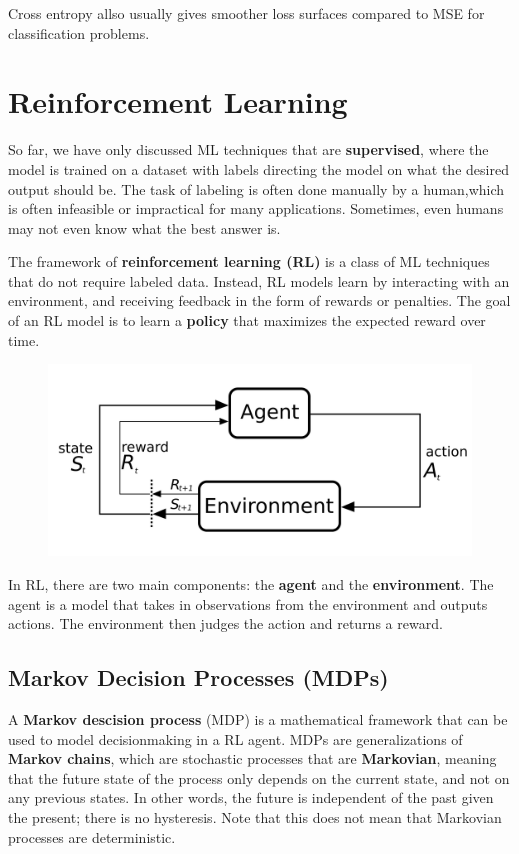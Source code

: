 \documentclass[12pt]{report}
\theoremstyle{definition}
\theoremstyle{remark}
\begin{document}
Cross entropy allso usually gives smoother loss surfaces compared to MSE for classification problems.

\chapter{Reinforcement Learning}
So far, we have only discussed ML techniques that are \textbf{supervised}, where the model is trained on a dataset with labels directing the model on what the desired output should be. The task of labeling is often done manually by a human,which is often infeasible or impractical for many applications. Sometimes, even humans may not even know what the best answer is.

The framework of \textbf{reinforcement learning (RL)} is a class of ML techniques that do not require labeled data. Instead, RL models learn by interacting with an environment, and receiving feedback in the form of rewards or penalties. The goal of an RL model is to learn a \textbf{policy} that maximizes the expected reward over time.

\begin{figure}[h]
    \centering
    \includegraphics[width=0.5\linewidth]{figs/RL_schematic.png}
    \caption{\cite{commons_filemarkov_2023}}
    \label{fig:enter-label}
\end{figure}

In RL, there are two main components: the \textbf{agent} and the \textbf{environment}. The agent is a model that takes in observations from the environment and outputs actions.  The environment then judges the action and returns a reward.

\section{Markov Decision Processes (MDPs)}

A \textbf{Markov descision process} (MDP) is a mathematical framework that can be used to model decisionmaking in a RL agent. MDPs are generalizations of \textbf{Markov chains}, which are stochastic processes that are \textbf{Markovian}, meaning that the future state of the process only depends on the current state, and not on any previous states. In other words, the future is independent of the past given the present; there is no hysteresis. Note that this does not mean that Markovian processes are deterministic.
\end{document}

